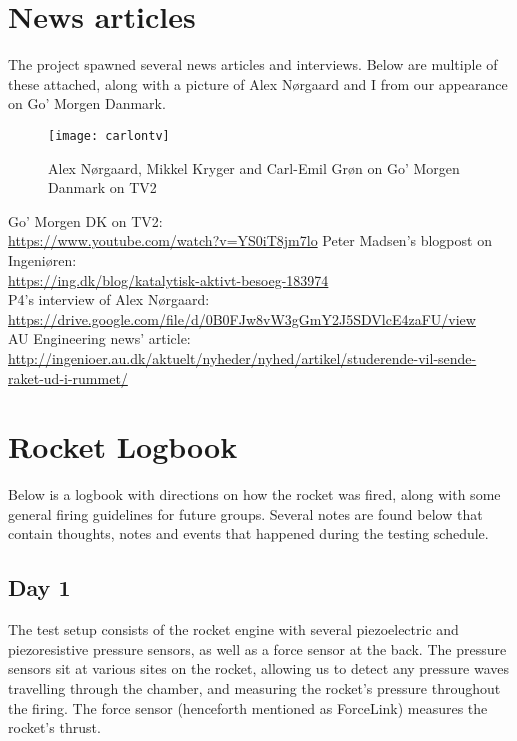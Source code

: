 \appendix

\chapter{News articles}\label{App:A}
The project spawned several news articles and interviews. Below are multiple of these attached, along with a picture of Alex Nørgaard and I from our appearance on Go' Morgen Danmark.

		\begin{figure}
			\centering
			\caption{Alex Nørgaard, Mikkel Kryger and Carl-Emil Grøn on Go' Morgen Danmark on TV2}
			\texttt{[image: carlontv]}
		\end{figure}

Go' Morgen DK on TV2:\\
\url{https://www.youtube.com/watch?v=YS0iT8jm7lo}
Peter Madsen's blogpost on Ingeniøren:\\ \url{https://ing.dk/blog/katalytisk-aktivt-besoeg-183974}\\
P4's interview of Alex Nørgaard:\\ \url{https://drive.google.com/file/d/0B0FJw8vW3gGmY2J5SDVlcE4zaFU/view}\\
AU Engineering news' article:\\ \url{http://ingenioer.au.dk/aktuelt/nyheder/nyhed/artikel/studerende-vil-sende-raket-ud-i-rummet/}




\chapter{Rocket Logbook} \label{App:B}

Below is a logbook with directions on how the rocket was fired, along with some general firing guidelines for future groups. Several notes are found below that contain thoughts, notes and events that happened during the testing schedule. 

	\section{Day 1}

		The test setup consists of the rocket engine with several piezoelectric and piezoresistive pressure sensors, as well as a force sensor at the back. The pressure sensors sit at various sites on the rocket, allowing us to detect any pressure waves travelling through the chamber, and measuring the rocket's pressure throughout the firing. The force sensor (henceforth mentioned as ForceLink) measures the rocket's thrust.

